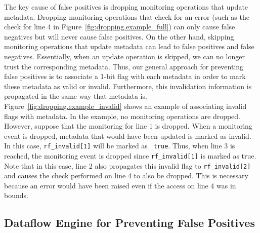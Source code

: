 The key cause of false positives is dropping monitoring operations that update
metadata. Dropping monitoring operations that check for an error (such as the check
for line 4 in Figure~\ref{fig:dropping.example_full}) can only cause
false negatives but will never cause false positives. On the other hand,
skipping monitoring operations that update metadata can lead to false positives
and false negatives.
Essentially, when an update operation is skipped, we can no longer trust the
corresponding metadata. Thus, our general approach for preventing false
positives is to associate a 1-bit flag with each metadata in order to mark these
metadata as valid or
invalid. Furthermore, this invalidation information is propagated in the same
way that metadata is. Figure~\ref{fig:dropping.example_invalid}
shows an example of associating invalid flags with metadata. In the example, no
monitoring operations are dropped. However, suppose that the monitoring for
line 1 is dropped. When a monitoring event is dropped, metadata that would have
been updated is marked as invalid. In this case, {\tt rf\_invalid[1]} will be
marked as {\tt
true}. Thus, when line 3 is reached, the monitoring event is dropped
since {\tt rf\_invalid[1]} is marked as true. Note that in this case, line 2
also propagates this invalid flag to {\tt rf\_invalid[2]} and causes the check
performed on line 4 to also be dropped. This is necessary because an error
would have been raised even if the access on line 4 was in bounds.

\subsection{Dataflow Engine for Preventing False Positives}
\label{sec:dropping.arch}

